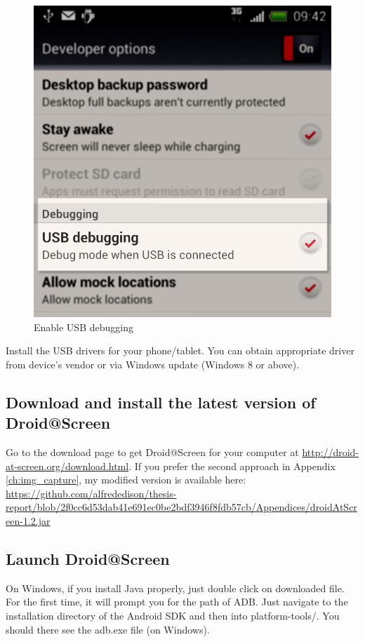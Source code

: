     \begin{figure}[H]
		\centering
		\includegraphics[scale=0.5]{Chapters/Fig/usb-db.png}
		\caption{Enable USB debugging}
		\label{fig:usb-db}
	\end{figure}
	
Install the USB drivers for your phone/tablet. You can obtain appropriate driver from device's vendor or via Windows update (Windows 8 or above).

\subsection{Download and install the latest version of Droid@Screen}
Go to the download page to get Droid@Screen for your computer at \url{http://droid-at-screen.org/download.html}.
\newline
If you prefer the second approach in Appendix \ref{ch:img_capture}, my modified version is available here:  \url{https://github.com/alfrededison/thesis-report/blob/2f0cc6d53dab41e691ec0be2bdf3946f8fdb57cb/Appendices/droidAtScreen-1.2.jar}

\subsection{Launch Droid@Screen}
On Windows, if you install Java properly, just double click on downloaded file.
\newline
For the first time, it will prompt you for the path of ADB. Just navigate to the installation directory of the Android SDK and then into platform-tools/. You should there see the adb.exe file (on Windows).

